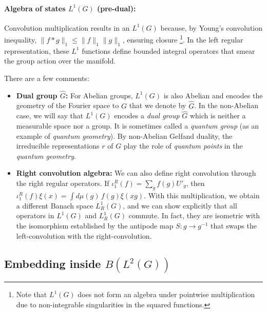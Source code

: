 \documentclass[11pt]{article}
\begin{document}
\paragraph{Algebra of states $L^1(G)$ (pre-dual):} Convolution multiplication results in an $L^1(G)$ because, by Young's convolution inequality, $\|f * g\|_1 \leq \|f\|_1 \|g\|_1$, ensuring closure \footnote{Note that $L^1(G)$ does not form an algebra under pointwise multiplication due to non-integrable singularities in the squared functions.}. In the left regular representation, these $L^1$ functions define bounded integral operators that smear the group action over the manifold.

There are a few comments:

\begin{itemize}
    \item {\bf Dual group $\hat{G}$:} For Abelian groups, $L^1(G)$ is also Abelian and encodes the geometry of the Fourier space to $G$ that we denote by $\hat{G}$. In the non-Abelian case, we will say that $L^1(G)$ encodes a {\it dual group} $\hat{G}$ which is neither a measurable space nor a group. It is sometimes called a {\it quantum group} (as an example of {\it quantum geometry}). By non-Abelian Gelfand duality, the irreducible representations $r$ of $G$ play the role of {\it quantum points} in the {\it quantum geometry}.

\item {\bf Right convolution algebra:} We can also define right convolution through the right regular operators. If $\iota_1^R(f)=\sum_g f(g)U'_g$, then $\iota_1^R(f)\xi(x)=\int d\mu(g)\, f(g)\xi(xg)$. With this multiplication, we obtain a different Banach space $L_R^1(G)$, and we can show explicitly that all operators in $L^1(G)$ and $L^1_R(G)$ commute. In fact, they are isometric with the isomorphism established by the antipode map $S:g\to g^{-1}$ that swaps the left-convolution with the right-convolution.

\end{itemize}

\subsection{Embedding inside $B(L^2(G))$}
\end{document}
